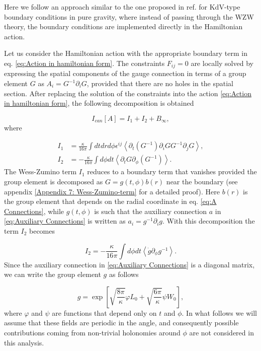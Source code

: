\documentclass[letterpaper,11pt,oneside]{book}
\begin{document}
Here we follow an approach similar to the one proposed in ref. \cite{Gonzalez:2018jgp}
for KdV-type boundary conditions in pure gravity, where instead of
passing through the WZW theory, the boundary conditions are implemented
directly in the Hamiltonian action.

Let us consider the Hamiltonian action with the appropriate boundary
term in eq. \eqref{eq:Action in hamiltonian form}. The constraints
$F_{ij}=0$ are locally solved by expressing the spatial components
of the gauge connection in terms of a group element $G$ as $A_{i}=G^{-1}\partial_{i}G$,
provided that there are no holes in the spatial section. After replacing
the solution of the constraints into the action \eqref{eq:Action in hamiltonian form},
the following decomposition is obtained

\begin{equation}
	I_{can}\left[A\right]=I_{1}+I_{2}+B_{\infty},\label{eq: Total actions WZW}
\end{equation}
where

\begin{align}
	I_{1} & =\frac{\kappa}{16\pi}\int dtdrd\phi\epsilon^{ij}\left\langle \partial_{t}\left(G^{-1}\right)\partial_{i}GG^{-1}\partial_{j}G\right\rangle ,\label{eq: I1 WZW action}\\
	I_{2} & =-\frac{\kappa}{16\pi}\int d\phi dt\left\langle \partial_{t}G\partial_{\phi}\left(G^{-1}\right)\right\rangle .\label{eq:I2 WZW action}
\end{align}
The Wess-Zumino term $I_{1}$ reduces to a boundary term that vanishes
provided the group element is decomposed as $G=g\left(t,\phi\right)b\left(r\right)$
near the boundary (see appendix \ref{Appendix 7: Wess-Zumino-term}\textcolor{red}{{}
}for a detailed proof). Here $b\left(r\right)$ is the group element
that depends on the radial coordinate in eq. \eqref{eq:A Connections},
while $g\left(t,\phi\right)$ is such that the auxiliary connection
$a$ in \eqref{eq:Auxiliary Connections} is written as $a_{i}=g^{-1}\partial_{i}g$.
With this decomposition the term $I_{2}$ becomes

\begin{equation}
	I_{2}=-\frac{\kappa}{16\pi}\int d\phi dt\left\langle \dot{g}\partial_{\phi}g^{-1}\right\rangle .\label{eq:I1 WZW 2}
\end{equation}
Since the auxiliary connection in \eqref{eq:Auxiliary Connections}
is a diagonal matrix, we can write the group element $g$ as follows

\begin{equation}
	g=\exp\left[\sqrt{\frac{8\pi}{\kappa}}\varphi L_{0}+\sqrt{\frac{6\pi}{\kappa}}\psi W_{0}\right],\label{eq:Gauss decomposition}
\end{equation}
where $\varphi$ and $\psi$ are functions that depend only on $t$
and $\phi$. In what follows we will assume that these fields are
periodic in the angle, and consequently possible contributions coming
from non-trivial holonomies around $\phi$ are not considered in this
analysis.
\end{document}
